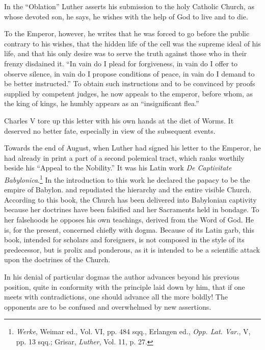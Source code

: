 In the “Oblation” Luther asserts his submission to the holy Catholic
Church, as whose devoted son, he says, he wishes with the help of God to
live and to die.

To the Emperor, however, he writes that he was forced to go before the
public contrary to his wishes, that the hidden life of the cell was the supreme
ideal of his life, and that his only desire was to serve the truth against those
who in their frenzy disdained it. “In vain do I plead for forgiveness, in vain
do I offer to observe silence, in vain do I propose conditions of peace, in vain
do I demand to be better instructed.” To obtain such instructions and to
be convinced by proofs supplied by competent judges, he now appeals to
the emperor, before whom, as the king of kings, he humbly appears as an
“insignificant flea.”

Charles V tore up this letter with his own hands at the diet of
Worms. It deserved no better fate, especially in view of the subsequent
events.

Towards the end of August, when Luther had signed his letter to
the Emperor, he had already in print a part of a second polemical
tract, which ranks worthily beside his “Appeal to the Nobility.” It
was his Latin work \textit{De Captivitate Babylonica}.\footnote
{\textit{Werke}, Weimar ed., Vol. VI, pp. 484 sqq., Erlangen ed., \textit{Opp. Lat. Var.}, V, pp. 13 sqq.;
Grisar, \textit{Luther}, Vol. 11, p. 27.}
In the introduction
to this work he declared the papacy to be the empire of Babylon. and
repudiated the hierarchy and the entire visible Church. According to
this book, the Church has been delivered into Babylonian captivity
because her doctrines have been falsified and her Sacraments held in
bondage. To her falsehoods he opposes his own teachings, derived
from the Word of God. He is, for the present, concerned chiefly with
dogma. Because of its Latin garb, this book, intended for scholars
and foreigners, is not composed in the style of its predecessor, but is
prolix and ponderous, as it is intended to be a scientific attack upon
the doctrines of the Church.

In his denial of particular dogmas the author advances beyond his
previous position, quite in conformity with the principle laid down
by him, that if one meets with contradictions, one should advance
all the more boldly! The opponents are to be confused and overwhelmed
by new assertions.

